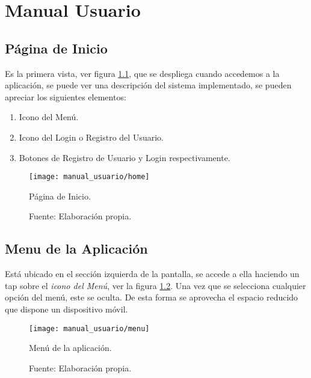 \chapter{Manual Usuario}

\section{Página de Inicio}

Es la primera vista, ver figura \ref{fig:home_view}, que se despliega cuando accedemos a la aplicación, se puede ver una descripción del sistema implementado, se pueden apreciar los siguientes elementos:

\begin{enumerate}
  \item Icono del Menú.
  \item Icono del Login o Registro del Usuario.
  \item Botones de Registro de Usuario y Login respectivamente.
\end{enumerate}

\begin{figure}[H]
      \begin{center}
        \texttt{[image: manual\_usuario/home]}

        \caption{Página de Inicio.}
        \label{fig:home_view}
        \caption*{Fuente: Elaboración propia.}
      \end{center}
\end{figure}

\section{Menu de la Aplicación}

Está ubicado en el sección izquierda de la pantalla, se accede a ella haciendo un tap sobre el \emph{icono del Menú}, ver la figura \ref{fig:menu_view}. Una vez que se selecciona cualquier opción del menú, este se oculta. De esta forma se aprovecha el espacio reducido que dispone un dispositivo móvil.


\begin{figure}[H]
      \begin{center}
        \texttt{[image: manual\_usuario/menu]}

        \caption{Menú de la aplicación.}
        \label{fig:menu_view}
        \caption*{Fuente: Elaboración propia.}
      \end{center}
\end{figure}


